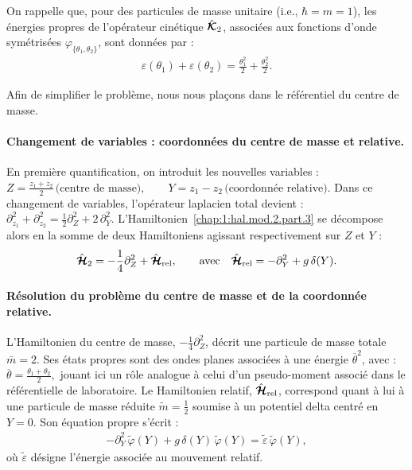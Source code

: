 On rappelle que, pour des particules de masse unitaire (i.e., \(\hbar = m = 1\)), les énergies propres de l’opérateur cinétique \(\hat{\bm{\mathcal{K}}}_2\), associées aux fonctions d’onde symétrisées \(\varphi_{\{ \theta_1 , \theta_2 \}}\), sont données par :
\begin{eqnarray}
	\varepsilon(\theta_1) + \varepsilon(\theta_2) = \frac{\theta_1^2}{2} + \frac{\theta_2^2}{2}.
\end{eqnarray}

Afin de simplifier le problème, nous nous plaçons dans le référentiel du centre de masse.

\paragraph{Changement de variables : coordonnées du centre de masse et relative.}

En première quantification, on introduit les nouvelles variables :
\(
Z = \frac{z_1 + z_2}{2} \, \text{(centre de masse)}, \qquad Y = z_1 - z_2 \, \text{(coordonnée relative)}.
\)
Dans ce changement de variables, l’opérateur laplacien total devient :
\(
\partial_{z_1}^2 + \partial_{z_2}^2 = \frac{1}{2} \partial_Z^2 + 2 \, \partial_Y^2.
\)
L’Hamiltonien~\eqref{chap:1:hal.mod.2.part.3} se décompose alors en la somme de deux Hamiltoniens agissant respectivement sur \(Z\) et \(Y\) :
\begin{eqnarray}\label{chap:1:hal.mod.2.part.4}
	\hat{\bm{\mathcal{H}}}_2 = -\frac{1}{4} \partial_Z^2 + \hat{\bm{\mathcal{H}}}_{\text{rel}}, \qquad \text{avec} \quad \hat{\bm{\mathcal{H}}}_{\text{rel}} = - \partial_Y^2 + g \, \delta(Y).
\end{eqnarray}

\paragraph{Résolution du problème du centre de masse et de la coordonnée relative.}

L’Hamiltonien du centre de masse, \(-\frac{1}{4} \partial_Z^2\), décrit une particule de masse totale \(\bar{m} = 2\). Ses états propres sont des ondes planes associées à une énergie \(\overline{\theta}^2\), avec :
\(
\overline{\theta} = \frac{\theta_1 + \theta_2}{2},
\)
jouant ici un rôle analogue à celui d’un pseudo-moment associé dans le référentielle de laboratoire.
Le Hamiltonien relatif, \(\hat{\bm{\mathcal{H}}}_{\text{rel}}\), correspond quant à lui à une particule de masse réduite \(\tilde{m} = \frac{1}{2}\) soumise à un potentiel delta centré en \(Y = 0\). Son équation propre s’écrit :
\begin{eqnarray}\label{chap:1:hal.mod.2.part.5}
	- \partial_Y^2 \, \tilde{\varphi}(Y) + g \, \delta(Y) \, \tilde{\varphi}(Y) = \tilde{\varepsilon} \, \tilde{\varphi}(Y),
\end{eqnarray}
où \(\tilde{\varepsilon}\) désigne l’énergie associée au mouvement relatif.

